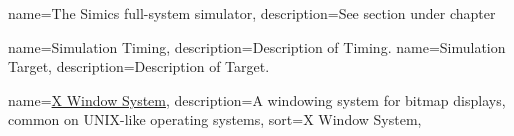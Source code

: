 \newcommand{\dvttermsoftwarerendering}{\dvtcmdcaponce{Software Rendering}}
{
  name=The Simics full-system simulator,
  description={See section  under chapter }
}
\newcommand{\dvttermsimics}{\glslink{dvtglosssimics}{Simics}}
\newcommand{\dvttermsics}{\dvtcmdabbrev{dvtglosssics}}
\newcommand{\dvttermsunmicrosystems}{Sun Microsystems, Inc.}

\newcommand{\dvttermttm}{\dvtcmdabbrev{dvtglossttm}}
{
  name=Simulation Timing,
  description={Description of Timing.}
}
\newcommand{\dvttermtiming}{\dvtcmdcaponcegloss{dvtglosstiming}{Timing}}
{
  name=Simulation Target,
  description={Description of Target.}
}
\newcommand{\dvttermtarget}{\dvtcmdcaponcegloss{dvtglosstarget}{Target}}

\newcommand{\dvttermvirtutech}{Virtutech}

\newcommand{\dvttermwarp}{\dvttermmicrosoft\ \dvtcmdabbrev{dvtglosswarp}}
\newcommand{\dvttermwindriver}{Wind River Systems, Inc.}

{
  name=\href{http://en.wikipedia.org/wiki/X_Window_System}{X Window System},
  description={A windowing system for bitmap displays, common on UNIX-like operating systems},
  sort={X Window System}, %
}
\newcommand{\dvttermxeleven}{\glslink{dvtglossxeleven}{X11}}
\newcommand{\dvttermxeightysix}{x86}



